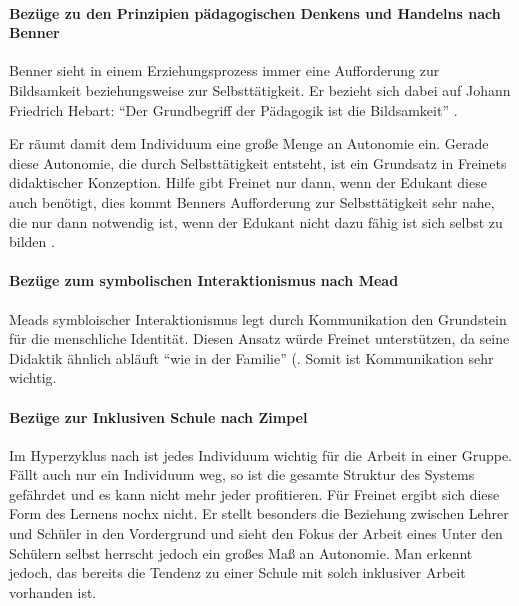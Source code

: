 \paragraph{Bezüge zu den Prinzipien pädagogischen Denkens und Handelns nach Benner}

Benner sieht in einem Erziehungsprozess immer eine Aufforderung zur Bildsamkeit beziehungsweise zur Selbsttätigkeit.
Er bezieht sich dabei auf Johann Friedrich Hebart:
``Der Grundbegriff der Pädagogik ist die Bildsamkeit'' \citep[~70]{benner-2012}.

Er räumt damit dem Individuum eine große Menge an Autonomie ein.
Gerade diese Autonomie, die durch Selbsttätigkeit entsteht, ist ein Grundsatz in Freinets didaktischer Konzeption.
Hilfe gibt Freinet nur dann, wenn der Edukant diese auch benötigt, dies kommt Benners Aufforderung zur Selbsttätigkeit sehr nahe, die nur dann notwendig ist, wenn der Edukant nicht dazu fähig ist sich selbst zu bilden \citep[vgl.][~91]{benner-2012}.

\paragraph{Bezüge zum symbolischen Interaktionismus nach Mead}

Meads symbloischer Interaktionismus legt durch Kommunikation den Grundstein für die menschliche Identität.
Diesen Ansatz würde Freinet unterstützen, da seine Didaktik ähnlich abläuft ``wie in der Familie'' \citep[~109]{Freinet1979}(.
Somit ist Kommunikation sehr wichtig.

\paragraph{Bezüge zur Inklusiven Schule nach Zimpel}

Im Hyperzyklus nach \citeauthor{Zimpel2012} ist jedes Individuum wichtig für die Arbeit in einer Gruppe.
Fällt auch nur ein Individuum weg, so ist die gesamte Struktur des Systems gefährdet und es kann nicht mehr jeder profitieren.
Für Freinet ergibt sich diese Form des Lernens nochx nicht.
Er stellt besonders die Beziehung zwischen Lehrer und Schüler in den Vordergrund und sieht den Fokus der Arbeit eines
Unter den Schülern selbst herrscht jedoch ein großes Maß an Autonomie.
Man erkennt jedoch, das bereits die Tendenz zu einer Schule mit solch inklusiver Arbeit vorhanden ist.
